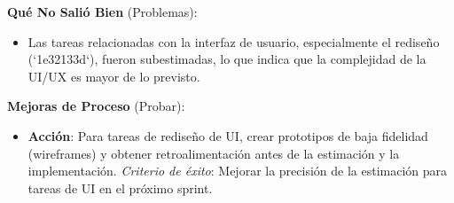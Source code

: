\textbf{Qué No Salió Bien} (Problemas):
\begin{itemize}
    \item Las tareas relacionadas con la interfaz de usuario, especialmente el rediseño (`1e32133d`), fueron subestimadas, lo que indica que la complejidad de la UI/UX es mayor de lo previsto.
\end{itemize}

\textbf{Mejoras de Proceso} (Probar):
\begin{itemize}
    \item \textbf{Acción}: Para tareas de rediseño de UI, crear prototipos de baja fidelidad (wireframes) y obtener retroalimentación antes de la estimación y la implementación. \textit{Criterio de éxito}: Mejorar la precisión de la estimación para tareas de UI en el próximo sprint.
\end{itemize}
